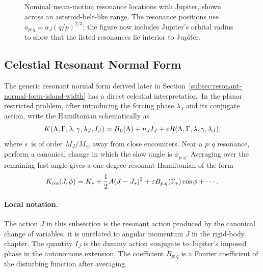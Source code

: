 \begin{figure}[htbp]
\centering
{}
\caption{Nominal mean-motion resonance locations with Jupiter, shown
across an asteroid-belt-like range. The resonance positions use
\(a_{p:q}=a_J(q/p)^{2/3}\); the figure now includes Jupiter's orbital radius to
show that the listed resonances lie interior to Jupiter.}
\label{fig:jupiter-resonance-locations}
\end{figure}

\subsection{Celestial Resonant Normal Form}
\label{subsec:celestial-resonant-normal-form}

The generic resonant normal form derived later in
Section~\ref{subsec:resonant-normal-form-island-width} has a direct celestial
interpretation.  In the planar restricted problem, after introducing the
forcing phase \(\lambda_J\) and its conjugate action, write the Hamiltonian
schematically as
\[
  K(\Lambda,\Gamma,\lambda,\gamma,\lambda_J,I_J)
  =
  H_0(\Lambda)+n_JI_J
  +\varepsilon R(\Lambda,\Gamma,\lambda,\gamma,\lambda_J),
\]
where \(\varepsilon\) is of order \(M_J/M_\odot\) away from close encounters.  Near a
\(p:q\) resonance, perform a canonical change in which the slow angle is
\(\phi_{p:q}\).  Averaging over the remaining fast angle gives a one-degree
resonant Hamiltonian of the form
\[
  K_{\rm res}(J,\phi)
  =
  K_*
  +
  \frac12 A(J-J_*)^2
  +
  \varepsilon B_{p:q}(\Gamma_*)\cos\phi
  +\cdots .
\]

\paragraph{Local notation.}
The action \(J\) in this subsection is the resonant action produced by the
canonical change of variables; it is unrelated to angular momentum \(J\) in the
rigid-body chapter.  The quantity \(I_J\) is the dummy action conjugate to
Jupiter's imposed phase in the autonomous extension.  The coefficient
\(B_{p:q}\) is a Fourier coefficient of the disturbing function after averaging.

